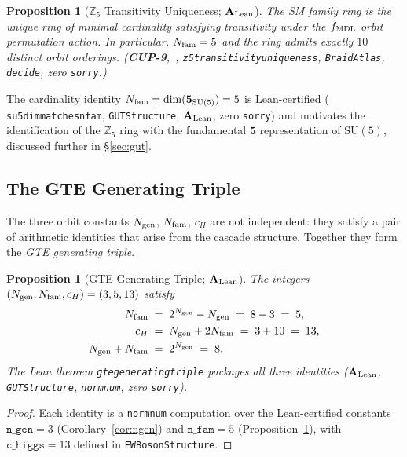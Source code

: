 \documentclass[11pt]{article}
\newtheorem{proposition}[theorem]{Proposition}
\theoremstyle{remark}
\newcommand{\Ngen}{N_{\rm gen}}
\newcommand{\Nfam}{N_{\rm fam}}
\newcommand{\cH}{c_H}
\newcommand{\lean}[1]{%
  \penalty-100
  \begingroup\def\_{\textunderscore\allowbreak}\texttt{#1}\endgroup}
\newcommand{\CatAL}{\ensuremath{\textbf{A}_{\rm Lean}}}
\begin{document}
\begin{proposition}[$\mathbb{Z}_5$ Transitivity Uniqueness; $\CatAL$]
\label{prop:z5}
The SM family ring is the unique ring of minimal cardinality satisfying transitivity
under the $f_{\rm MDL}$ orbit permutation action.
In particular, $\Nfam = 5$ and the ring admits exactly $10$ distinct orbit orderings.
(\textbf{CUP-9},~\cite{SpivackCompUniversality};
\lean{z5\_transitivity\_uniqueness}, \texttt{BraidAtlas},
\lean{decide}, zero \texttt{sorry}.)
\end{proposition}

The cardinality identity $\Nfam = \dim(\mathbf{5}_{\mathrm{SU}(5)}) = 5$ is
Lean-certified (\lean{su5\_dim\_matches\_nfam}, \texttt{GUTStructure}, $\CatAL$,
zero \texttt{sorry}) and motivates the identification of the $\mathbb{Z}_5$ ring
with the fundamental $\mathbf{5}$ representation of $\mathrm{SU}(5)$,
discussed further in \S\ref{sec:gut}.

\subsection{The GTE Generating Triple}
\label{sec:prelim_triple}

The three orbit constants $\Ngen$, $\Nfam$, $\cH$ are not independent: they satisfy
a pair of arithmetic identities that arise from the cascade structure.  Together they
form the \emph{GTE generating triple}.

\begin{proposition}[GTE Generating Triple; $\CatAL$]
\label{prop:triple}
The integers $(\Ngen, \Nfam, \cH) = (3, 5, 13)$ satisfy
\begin{align}
  \Nfam         &\;=\; 2^{\Ngen} - \Ngen \;=\; 8 - 3 \;=\; 5,
  \label{eq:nfam_formula}\\
  \cH           &\;=\; \Ngen + 2\Nfam    \;=\; 3 + 10 \;=\; 13,
  \label{eq:ch_formula}\\
  \Ngen + \Nfam &\;=\; 2^{\Ngen}         \;=\; 8.
  \label{eq:gen_fam_sum}
\end{align}
The Lean theorem \lean{gte\_generating\_triple} packages all three identities
($\CatAL$, \texttt{GUTStructure}, \lean{norm\_num}, zero \texttt{sorry}).
\end{proposition}

\begin{proof}
Each identity is a \lean{norm\_num} computation over the Lean-certified constants
$\texttt{n\_gen} = 3$ (Corollary~\ref{cor:ngen}) and
$\texttt{n\_fam} = 5$ (Proposition~\ref{prop:z5}), with
$\texttt{c\_higgs} = 13$ defined in \texttt{EWBosonStructure}.
\end{proof}
\end{document}
